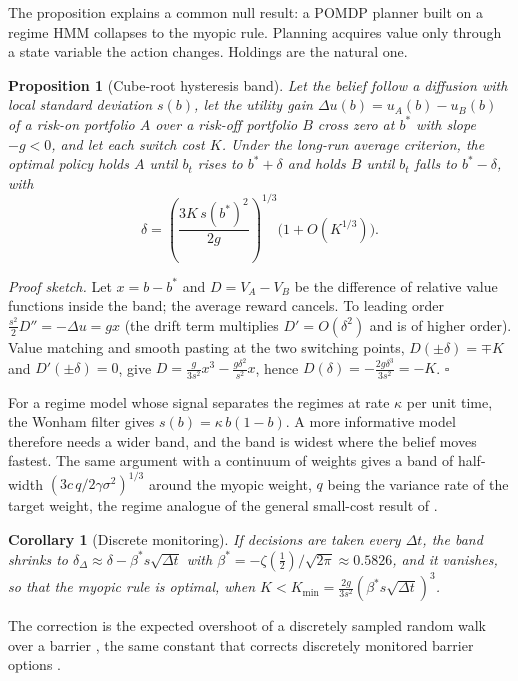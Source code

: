 \documentclass[sigconf,nonacm]{acmart}
\newtheorem{proposition}{Proposition}
\newtheorem{corollary}{Corollary}
\begin{document}
The proposition explains a common null result: a POMDP planner built on a regime HMM collapses to the myopic rule. Planning acquires value only through a state variable the action changes. Holdings are the natural one.

\begin{proposition}[Cube-root hysteresis band]\label{prop:band}
Let the belief follow a diffusion with local standard deviation $s(b)$, let the utility gain $\Delta u(b)=u_A(b)-u_B(b)$ of a risk-on portfolio $A$ over a risk-off portfolio $B$ cross zero at $b^*$ with slope $-g<0$, and let each switch cost $K$. Under the long-run average criterion, the optimal policy holds $A$ until $b_t$ rises to $b^*+\delta$ and holds $B$ until $b_t$ falls to $b^*-\delta$, with
\begin{equation}\label{eq:law}
\delta=\left(\frac{3K\,s(b^*)^2}{2g}\right)^{1/3}\big(1+O(K^{1/3})\big).
\end{equation}
\end{proposition}
\emph{Proof sketch.} Let $x=b-b^*$ and $D=V_A-V_B$ be the difference of relative value functions inside the band; the average reward cancels. To leading order $\tfrac{s^2}{2}D''=-\Delta u=gx$ (the drift term multiplies $D'=O(\delta^2)$ and is of higher order). Value matching and smooth pasting at the two switching points, $D(\pm\delta)=\mp K$ and $D'(\pm\delta)=0$, give $D=\tfrac{g}{3s^2}x^3-\tfrac{g\delta^2}{s^2}x$, hence $D(\delta)=-\tfrac{2g\delta^3}{3s^2}=-K$. $\square$

For a regime model whose signal separates the regimes at rate $\kappa$ per unit time, the Wonham filter gives $s(b)=\kappa\,b(1-b)$. A more informative model therefore needs a wider band, and the band is widest where the belief moves fastest. The same argument with a continuum of weights gives a band of half-width $(3c\,q/2\gamma\sigma^2)^{1/3}$ around the myopic weight, $q$ being the variance rate of the target weight, the regime analogue of the general small-cost result of \citet{kallsen2017general}.

\begin{corollary}[Discrete monitoring]\label{cor:disc}
If decisions are taken every $\Delta t$, the band shrinks to $\delta_{\Delta}\approx\delta-\beta^{*}s\sqrt{\Delta t}$ with $\beta^{*}=-\zeta(\tfrac12)/\sqrt{2\pi}\approx0.5826$, and it vanishes, so that the myopic rule is optimal, when $K<K_{\min}=\tfrac{2g}{3s^2}(\beta^{*}s\sqrt{\Delta t})^3$.
\end{corollary}
The correction is the expected overshoot of a discretely sampled random walk over a barrier \cite{siegmund1979corrected}, the same constant that corrects discretely monitored barrier options \cite{broadie1997continuity}.
\end{document}

